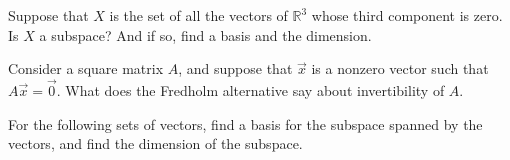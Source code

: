 \begin{exercise}
Suppose that $X$ is the set of all the vectors of ${\mathbb{R}}^3$ whose
third component is zero.  Is $X$ a subspace?  And if so, find a basis
and the dimension.
\end{exercise}

\begin{exercise}
Consider a square matrix $A$, and suppose that $\vec{x}$ is a nonzero
vector such that $A \vec{x} = \vec{0}$.  What does the Fredholm alternative
say about invertibility of $A$.
\end{exercise}

\setcounter{exercise}{100}

\begin{exercise}
For the following sets of vectors, find a basis for the subspace spanned by
the vectors, and find the dimension of the subspace.
\end{exercise}
